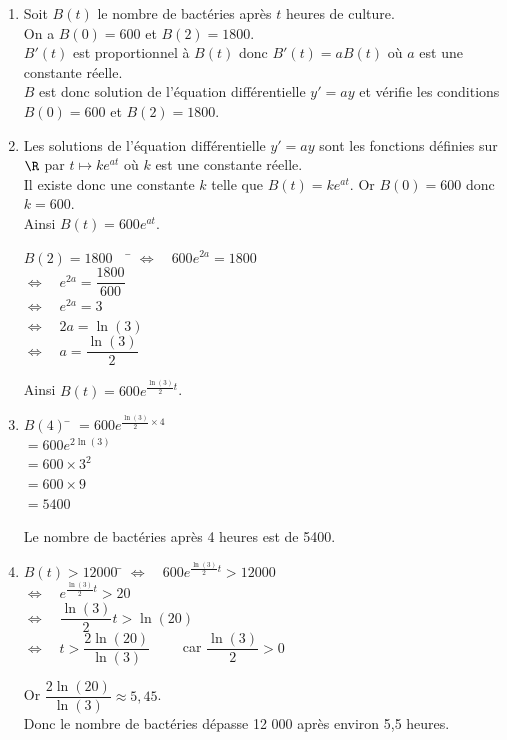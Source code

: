 \documentclass[a4paper,11pt,exos]{nsi} %
\begin{document}
\textcolor{UGLiBlue}{
    \begin{enumerate}
        \item Soit $B(t)$ le nombre de bactéries après $t$ heures de culture.\\
        On a $B(0)=600$ et $B(2)=1800$.\\
        $B'(t)$ est proportionnel à $B(t)$ donc $B'(t)=aB(t)$ où $a$ est une constante réelle.\\
        $B$ est donc solution de l'équation différentielle $y'=ay$ et vérifie les conditions $B(0)=600$ et $B(2)=1800$.
        \item Les solutions de l'équation différentielle $y'=ay$ sont les fonctions définies sur $\R$ par $t\mapsto ke^{at}$ où $k$ est une constante réelle.\\
        Il existe donc une constante $k$ telle que $B(t)=ke^{at}$. Or $B(0)=600$ donc $k=600$.\\
        Ainsi $B(t)=600e^{at}$.
        \begin{tabbing}
            $B(2)=1800 \quad$ \= $\iff \quad 600e^{2a}=1800$\\
            \> $\iff \quad e^{2a}=\dfrac{1800}{600}$\\
            \> $\iff \quad e^{2a}=3$\\
            \> $\iff \quad 2a=\ln(3)$\\
            \> $\iff \quad a=\dfrac{\ln(3)}{2}$
        \end{tabbing}
        Ainsi $B(t)=600e^{\frac{\ln(3)}{2}t}$.
        \item \begin{tabbing}
            $B(4)$ \= $=600e^{\frac{\ln(3)}{2}\times 4}$\\
            \> $=600e^{2\ln(3)}$\\
            \> $=600\times 3^2$\\
            \> $=600\times 9$\\
            \> $=5400$
        \end{tabbing}
        Le nombre de bactéries après 4 heures est de 5400.
        \item \begin{tabbing}
            $B(t)>12000$ \= $\iff \quad 600e^{\frac{\ln(3)}{2}t}>12000$\\
            \> $\iff \quad e^{\frac{\ln(3)}{2}t}>20$\\
            \> $\iff \quad \dfrac{\ln(3)}{2}t>\ln(20)$\\
            \> $\iff \quad t>\dfrac{2\ln(20)}{\ln(3)} \qquad$ car $\dfrac{\ln(3)}{2}>0$\\
        \end{tabbing}
        Or $\dfrac{2\ln(20)}{\ln(3)}\approx 5,45$.\\
        Donc le nombre de bactéries dépasse 12 000 après environ 5,5 heures.
    \end{enumerate}
}
\end{document}
